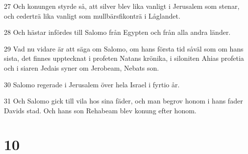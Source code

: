 \par 27 Och konungen styrde så, att silver blev lika vanligt i Jerusalem som stenar, och cederträ lika vanligt som mullbärsfikonträ i Låglandet.
\par 28 Och hästar infördes till Salomo från Egypten och från alla andra länder.
\par 29 Vad nu vidare är att säga om Salomo, om hans första tid såväl som om hans sista, det finnes upptecknat i profeten Natans krönika, i siloniten Ahias profetia och i siaren Jedais syner om Jerobeam, Nebats son.
\par 30 Salomo regerade i Jerusalem över hela Israel i fyrtio år.
\par 31 Och Salomo gick till vila hos sina fäder, och man begrov honom i hans fader Davids stad. Och hans son Rehabeam blev konung efter honom.

\chapter{10}

